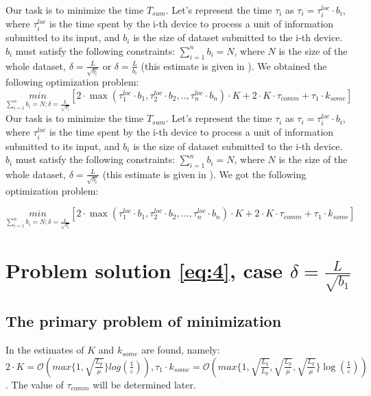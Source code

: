 \documentclass{article}
\begin{document}
Our task is to minimize the time $T_{sum}$. Let's represent the time $\tau_i$ as $\tau_i = \tau_i^{loc}\cdot b_i$, where $\tau_i^{loc}$ is the time spent by the i-th device to process a unit of information submitted to its input, and $b_i$ is the size of dataset submitted to the i-th device. $b_i$ must satisfy the following constraints: $\sum\limits_{i = 1}^{n} b_i = N$, where $N$ is the size of the whole dataset, $\delta = \frac{L}{\sqrt{b_i}}$ or $\delta = \frac{L}{b_i}$ (this estimate is given in \cite{kovalev2022optimal}).
We obtained the following optimization problem:
\begin{equation}
    \label{eq:4}
    \underset{\sum\limits_{i = 1}^{n} b_i = N; \delta = \frac{L}{\sqrt{b_i}}}{min}[ 2\cdot\max(\tau_1^{loc}\cdot b_1, \tau_2^{loc}\cdot b_2, . ., \tau_n^{loc}\cdot b_n)\cdot K + 2\cdot K\cdot\tau_{comm} + \tau_1\cdot k_{some}]
\end{equation}
Our task is to minimize the time $T_{sum}$. Let's represent the time $\tau_i$ as $\tau_i = \tau_i^{loc}\cdot b_i$, where $\tau_i^{loc}$ is the time spent by the i-th device to process a unit of information submitted to its input, and $b_i$ is the size of dataset submitted to the i-th device. $b_i$ must satisfy the following constraints: $\sum\limits_{i = 1}^{n} b_i = N$, where $N$ is the size of the whole dataset, $\delta = \frac{L}{\sqrt{b_i}}$ (this estimate is given in \cite{kovalev2022optimal}).
We got the following optimization problem:

\begin{equation}
    \label{eq:4}
    \underset{\sum\limits_{i = 1}^{n} b_i = N; \delta = \frac{L}{\sqrt{b_i}}}{min}[ 2\cdot\max(\tau_1^{loc}\cdot b_1, \tau_2^{loc}\cdot b_2, ..., \tau_n^{loc}\cdot b_n)\cdot K + 2\cdot K\cdot\tau_{comm} + \tau_1\cdot k_{some}]
\end{equation}

\section{Problem solution \ref{eq:4}, case $\delta = \frac{L}{\sqrt{b_1}}$}

\subsection{The primary problem of minimization}
In \cite{kovalev2022optimal} the estimates of $K$ and $k_{some}$ are found, namely: \\ $2\cdot K = \mathcal O(max\{1, \sqrt{\frac{L_p}{\mu}}\}log(\frac{1}{\varepsilon})), \tau_1\cdot k_{some} = \mathcal O(max\{1, \sqrt{\frac{L_q}{L_p}}, \sqrt{\frac{L_p}{\mu}}, \sqrt{\frac{L_q}{\mu}}\}\log(\frac{1}{\varepsilon}))$. The value of $\tau_{comm}$ will be determined later. 
\end{document}
